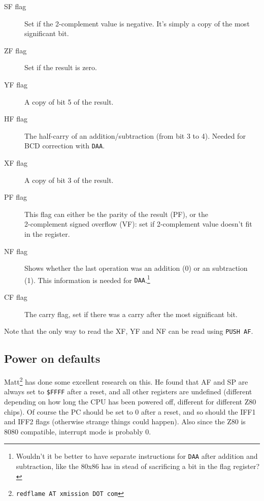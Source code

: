 \documentclass[12pt,twoside,openright,a4paper]{book}
\begin{document}
\begin{description}

	\item[SF flag]
	Set if the 2-complement value is negative. It's simply a copy of the most significant bit.

	\item[ZF flag]
	Set if the result is zero.

	\item[YF flag]
	A copy of bit 5 of the result.

	\item[HF flag]
	The half-carry of an addition/subtraction (from bit 3 to 4). Needed for BCD correction with {\tt DAA}.

	\item[XF flag]
	A copy of bit 3 of the result.

	\item[PF flag]
	This flag can either be the parity of the result (PF), or the \\ 2-complement signed overflow (VF): set if 2-complement value doesn't fit in the register.

	\item[NF flag]
	Shows whether the last operation was an addition (0) or an subtraction (1). This information is needed for {\tt DAA}.\footnote{Wouldn't it be better to have separate instructions for {\tt DAA} after addition and subtraction, like the 80x86 has in stead of sacrificing a bit in the flag register?}

	\item[CF flag]
	The carry flag, set if there was a carry after the most significant bit.

\end{description}

Note that the only way to read the XF, YF and NF can be read using
{\tt PUSH AF}.


\pagebreak
\subsection{Power on defaults}
\label{pon}

Matt\footnote{\tt{redflame AT xmission DOT com}} has done some excellent research on this. He found that AF and SP are always set to {\tt \$FFFF} after a reset, and all other registers are undefined (different depending on how long the CPU has been powered off, different for different Z80 chips). Of course the PC should be set to 0 after a reset, and so should the IFF1 and IFF2 flags (otherwise strange things could happen). Also since the Z80 is 8080 compatible, interrupt mode is probably 0.
\end{document}
